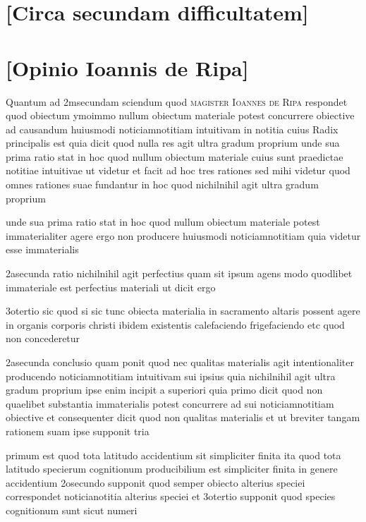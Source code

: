 \documentclass[twoside, openright]{report}
\newcommand{\name}[1]{\textsc{#1}}
\begin{document}
        \bigskip
         \section*{[Circa secundam difficultatem]} 
        \bigskip
         \section*{[Opinio Ioannis de Ripa]} 
        \pstart
        Quantum ad 2msecundam sciendum quod \name{magister Ioannes de Ripa} respondet quod obiectum ymoimmo nullum obiectum materiale potest concurrere obiective ad causandum huiusmodi noticiamnotitiam intuitivam in notitia cuius Radix principalis est quia dicit quod nulla res agit ultra gradum proprium unde sua prima ratio stat in hoc quod nullum obiectum materiale cuius sunt praedictae notitiae intuitivae ut videtur et facit ad hoc tres rationes sed mihi videtur quod omnes rationes suae fundantur in hoc quod nichilnihil agit ultra gradum proprium
        \pend
     
        \pstart
        unde sua prima ratio stat in hoc quod nullum obiectum materiale potest immaterialiter agere ergo non producere huiusmodi noticiamnotitiam quia videtur esse immaterialis
        \pend
     
        \pstart
        2asecunda ratio nichilnihil agit perfectius quam sit ipsum agens modo quodlibet immateriale est perfectius materiali ut dicit ergo
        \pend
     
        \pstart
        3otertio sic quod si sic tunc obiecta materialia in sacramento altaris possent agere in organis corporis christi ibidem existentis calefaciendo frigefaciendo etc quod non concederetur
        \pend
     
        \pstart
        2asecunda conclusio quam ponit quod nec qualitas materialis agit intentionaliter producendo noticiamnotitiam intuitivam sui ipsius quia nichilnihil agit ultra gradum proprium ipse enim incipit a superiori quia primo dicit quod non quaelibet substantia immaterialis potest concurrere ad sui noticiamnotitiam obiective et consequenter dicit quod non qualitas materialis et ut breviter tangam rationem suam ipse supponit tria
        \pend
     
        \pstart
        primum est quod tota latitudo accidentium sit simpliciter finita ita quod tota latitudo specierum cognitionum producibilium est simpliciter finita in genere accidentium 2osecundo supponit quod semper obiecto alterius speciei correspondet noticianotitia alterius speciei et 3otertio supponit quod species cognitionum sunt sicut numeri
        \pend
     
\end{document}
